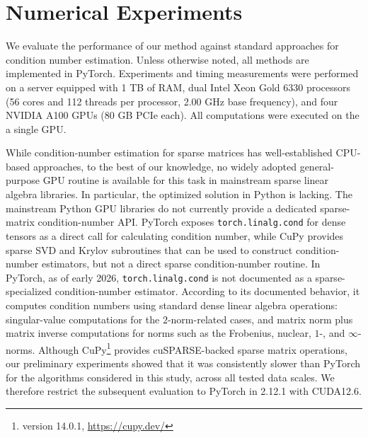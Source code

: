 \documentclass[11pt,a4paper]{article}
\theoremstyle{plain}
\theoremstyle{definition}
\theoremstyle{remark}
\begin{document}
\section{Numerical Experiments}\label{sec:exps}
We evaluate the performance of our method against standard approaches for condition number estimation. Unless otherwise noted, all methods are implemented in PyTorch. Experiments and timing measurements were performed on a server equipped with 1 TB of RAM, dual Intel Xeon Gold 6330 processors (56 cores and 112 threads per processor, 2.00 GHz base frequency), and four NVIDIA A100 GPUs (80 GB PCIe each). All computations were executed on the a single GPU.

While condition-number estimation for sparse matrices has well-established CPU-based approaches, to the best of our knowledge, no widely adopted general-purpose GPU routine is available for this task in mainstream sparse linear algebra libraries. In particular, the optimized solution in Python is lacking. The mainstream Python GPU libraries do not currently provide a dedicated sparse-matrix condition-number API. PyTorch exposes \texttt{torch.linalg.cond} for dense tensors as a direct call for calculating condition number, while CuPy provides sparse SVD and Krylov subroutines that can be used to construct condition-number estimators, but not a direct sparse condition-number routine. In PyTorch, as of early 2026, \texttt{torch.linalg.cond} is not documented as a sparse-specialized condition-number estimator. According to its documented behavior, it computes condition numbers using standard dense linear algebra operations: singular-value computations for the $2$-norm-related cases, and matrix norm plus matrix inverse computations for norms such as the Frobenius, nuclear, $1$-, and $\infty$-norms.
Although CuPy\footnote{version 14.0.1, \url{https://cupy.dev/}} provides cuSPARSE-backed sparse matrix operations, our preliminary experiments showed that it was consistently slower than PyTorch for the algorithms considered in this study, across all tested data scales. We therefore restrict the subsequent evaluation to PyTorch in 2.12.1 with CUDA12.6.
\end{document}
